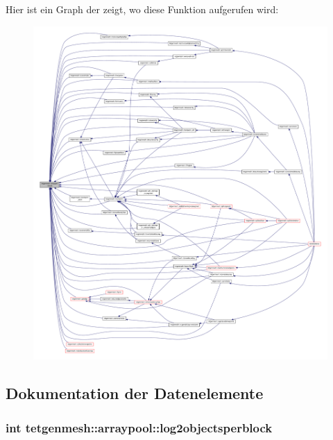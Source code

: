 Hier ist ein Graph der zeigt, wo diese Funktion aufgerufen wird\-:\nopagebreak
\begin{figure}[H]
\begin{center}
\leavevmode
\includegraphics[width=350pt]{classtetgenmesh_1_1arraypool_a19030126ef81a9ff3c4aca35f0347cdc_icgraph}
\end{center}
\end{figure}




\subsection{Dokumentation der Datenelemente}
\hypertarget{classtetgenmesh_1_1arraypool_ab61ada3b2fc49879a160a919e9994279}{
\subsubsection[{log2objectsperblock}]{\setlength{\rightskip}{0pt plus 5cm}int tetgenmesh\-::arraypool\-::log2objectsperblock}}\label{classtetgenmesh_1_1arraypool_ab61ada3b2fc49879a160a919e9994279}


